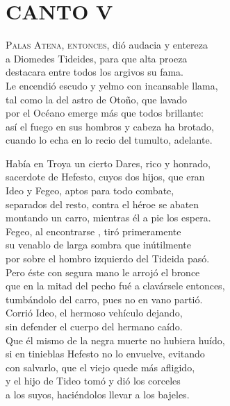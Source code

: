 \bnum
\section*{\centering\textbf{CANTO V}}
%
\postart
\textsc{Palas Atena, entonces,} dió audacia y entereza\\
a Diomedes Tideides, para que alta proeza\\
destacara entre todos los argivos su fama.\\
Le encendió escudo y yelmo con incansable llama,\\
tal como la del astro de Otoño, que lavado\\
por el Océano emerge más que todos brillante:\\
así el fuego en sus hombros y cabeza ha brotado,\\
cuando lo echa en lo recio del tumulto, adelante.\par
Había en Troya un cierto Dares, rico y honrado,\\
sacerdote de Hefesto, cuyos dos hijos, que eran\\
Ideo y Fegeo, aptos para todo combate,\\
separados del resto, contra el héroe se abaten\\
montando un carro, mientras él a pie los espera.\\
Fegeo, al encontrarse , tiró primeramente\\
su venablo de larga sombra que inútilmente\\
por sobre el hombro izquierdo del Tideida pasó.\\
Pero éste con segura mano le arrojó el bronce\\
que en la mitad del pecho fué a clavársele entonces,\\
tumbándolo del carro, pues no en vano partió.\\
Corrió Ideo, el hermoso vehículo dejando,\\
sin defender el cuerpo del hermano caído.\\
Que él mismo de la negra muerte no hubiera huído,\\
si en tinieblas Hefesto no lo envuelve, evitando\\
con salvarlo, que el viejo quede más afligido,\\
y el hijo de Tideo tomó y dió los corceles\\
a los suyos, haciéndolos llevar a los bajeles.\\
